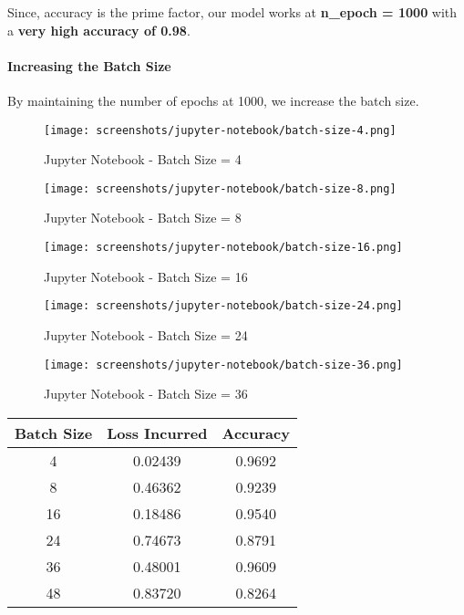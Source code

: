 Since, accuracy is the prime factor, our model works at \textbf{n\_epoch = 1000} with a \textbf{very high accuracy of 0.98}.

\paragraph{Increasing the Batch Size}

By maintaining the number of epochs at 1000, we increase the batch size.

\begin{figure}[H]
    \centering
    \texttt{[image: screenshots/jupyter-notebook/batch-size-4.png]}
    \caption{Jupyter Notebook - Batch Size = 4}
\end{figure}

\begin{figure}[H]
    \centering
    \texttt{[image: screenshots/jupyter-notebook/batch-size-8.png]}
    \caption{Jupyter Notebook - Batch Size = 8}
\end{figure}

\begin{figure}[H]
    \centering
    \texttt{[image: screenshots/jupyter-notebook/batch-size-16.png]}
    \caption{Jupyter Notebook - Batch Size = 16}
\end{figure}

\begin{figure}[H]
    \centering
    \texttt{[image: screenshots/jupyter-notebook/batch-size-24.png]}
    \caption{Jupyter Notebook - Batch Size = 24}
\end{figure}

\begin{figure}[H]
    \centering
    \texttt{[image: screenshots/jupyter-notebook/batch-size-36.png]}
    \caption{Jupyter Notebook - Batch Size = 36}
\end{figure}

\begin{center}
    \begin{tabular}{ |c|c|c| } 
        \hline
        Batch Size & Loss Incurred & Accuracy \\ [0.5ex]
        \hline\hline
        4 & 0.02439 & 0.9692 \\
        8 & 0.46362 & 0.9239 \\
        16 & 0.18486 & 0.9540 \\
        24 & 0.74673 & 0.8791 \\
        36 & 0.48001 & 0.9609 \\
        48 & 0.83720 & 0.8264 \\
        \hline
    \end{tabular}
\end{center}


